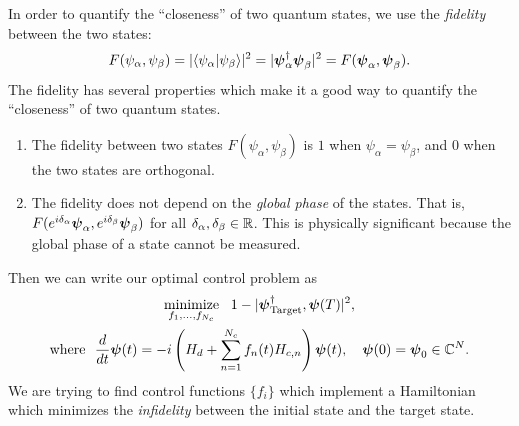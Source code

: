 \documentclass[letterpaper]{tufte-handout}
\begin{document}
In order to quantify the ``closeness'' of two quantum states, we use the \emph{fidelity} between the two states:
\begin{equation} \label{eq:fidelity}
    F(\psi_\alpha, \psi_\beta) = |\langle\psi_\alpha|\psi_\beta\rangle|^2 = |\boldsymbol{\psi}_\alpha^\dagger \boldsymbol{\psi}_\beta|^2 = F(\boldsymbol{\psi}_\alpha, \boldsymbol{\psi}_\beta).
\end{equation}
The fidelity has several properties which make it a good way to quantify the ``closeness'' of two quantum states.
\begin{enumerate}
    \item The fidelity between two states $F(\psi_\alpha, \psi_\beta)$ is $1$ when $\psi_\alpha = \psi_\beta$, and $0$ when the two states are orthogonal.
    \item The fidelity does not depend on the \emph{global phase} of the states. That is, $F(e^{i\delta_\alpha}\boldsymbol{\psi}_\alpha, e^{i\delta_\beta}\boldsymbol{\psi}_\beta)$ for all $\delta_\alpha, \delta_\beta \in \mathbb{R}$. This is physically significant because the global phase of a state cannot be measured.
\end{enumerate}
Then we can write our optimal control problem as
\begin{gather*}
    \operatorname*{minimize}_{f_1,\dots,f_{N_c}}\ \  1 - |\boldsymbol{\psi}_{\textrm{Target}}^\dagger, \boldsymbol{\psi}(T)|^2, \\
    \textrm{where}\ \ \frac{d}{dt}\boldsymbol{\psi}(t) = -i\left(H_d + \sum_{n=1}^{N_c} f_n(t)H_{c,n}\right)\boldsymbol{\psi}(t),\quad \boldsymbol{\psi}(0) = \boldsymbol{\psi}_0 \in \mathbb{C}^N.
\end{gather*}
We are trying to find control functions $\{f_i\}$ which implement a Hamiltonian which minimizes the \emph{infidelity} between the initial state and the target state.
\end{document}
